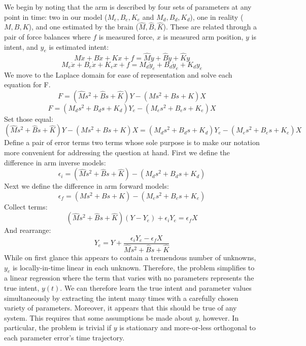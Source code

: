 \documentclass[10pt]{article}
\begin{document}
We begin by noting that the arm is described by four sets of parameters at any point in time: two in our model ($M_e, B_e, K_e$ and $M_d, B_d, K_d$), one in reality ($M, B, K$), and one estimated by the brain ($\hat{M}, \hat{B}, \hat{K}$). These are related through a pair of force balances where $f$ is measured force, $x$ is measured arm position, $y$ is intent, and $y_e$ is estimated intent:
\begin{equation}
M\ddot{x}+B\dot{x}+Kx+f=\hat{M}\ddot{y}+\hat{B}\dot{y}+\hat{K}y
\end{equation}
\begin{equation}
M_e\ddot{x}+B_e\dot{x}+K_ex+f=M_d\ddot{y}_e+B_d\dot{y}_e+K_dy_e
\end{equation}
We move to the Laplace domain for ease of representation and solve each equation for F.
\begin{equation}
F=(\hat{M}s^2+\hat{B}s+\hat{K})Y-(Ms^2+Bs+K)X
\end{equation}
\begin{equation}
F=(M_ds^2+B_ds+K_d)Y_e-(M_es^2+B_es+K_e)X
\end{equation}
Set those equal:
\begin{equation}
(\hat{M}s^2+\hat{B}s+\hat{K})Y-(Ms^2+Bs+K)X=(M_ds^2+B_ds+K_d)Y_e-(M_es^2+B_es+K_e)X
\end{equation}
Define a pair of error terms two terms whose sole purpose is to make our notation more convenient for addressing the question at hand. First we define the difference in arm inverse models:
\begin{equation}
\epsilon_i=(\hat{M}s^2+\hat{B}s+\hat{K})-(M_ds^2+B_ds+K_d)
\end{equation}
Next we define the difference in arm forward models:
\begin{equation}
\epsilon_f=(Ms^2+Bs+K)-(M_es^2+B_es+K_e)
\end{equation}
Collect terms:
\begin{equation}
(\hat{M}s^2+\hat{B}s+\hat{K})(Y-Y_e)+\epsilon_i Y_e=\epsilon_f X
\end{equation}
And rearrange:
\begin{equation}
Y_e=Y+\frac{\epsilon_i Y_e-\epsilon_f X}{\hat{M}s^2+\hat{B}s+\hat{K}}
\end{equation}
While on first glance this appears to contain a tremendous number of unknowns, $y_e$ is locally-in-time linear in each unknown. Therefore, the problem simplifies to a linear regression where the term that varies with no parameters represents the true intent, $y(t)$. We can therefore learn the true intent and parameter values simultaneously by extracting the intent many times with a carefully chosen variety of parameters. Moreover, it appears that this should be true of any system. This requires that some assumptions be made about $y$, however. In particular, the problem is trivial if $y$ is stationary and more-or-less orthogonal to each parameter error's time trajectory.
\end{document}
